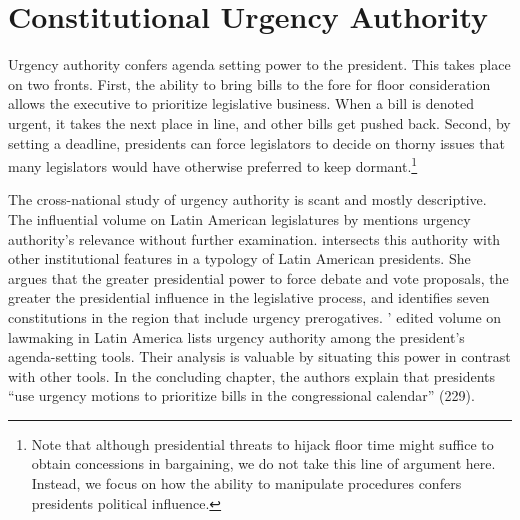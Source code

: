 \documentclass[letter,12pt]{article}
\begin{document}
\section{Constitutional Urgency Authority}

Urgency authority confers agenda setting power to the president. This takes place on two fronts. First, the ability to bring bills to the fore for floor consideration allows the executive to prioritize legislative business. When a bill is denoted urgent, it takes the next place in line, and other bills get pushed back. Second, by setting a deadline, presidents can force legislators to decide on thorny issues that many legislators would have otherwise preferred to keep dormant.\footnote{Note that although presidential threats to hijack floor time might suffice to obtain concessions in bargaining, we do not take this line of argument here. Instead, we focus on how the ability to manipulate procedures confers presidents political influence.} 

The cross-national study of urgency authority is scant and mostly descriptive. The influential volume on Latin American legislatures by \citet{morgenstern.nacif.2002} mentions urgency authority's relevance without further examination. \citet{garcia.montero.presidentes.2009} intersects this authority with other institutional features in a typology of Latin American presidents. She argues that the greater presidential power to force debate and vote proposals, the greater the presidential influence in the legislative process, and identifies seven constitutions in the region that include urgency prerogatives. \citeauthor{aleman-tsebelis-2016-book}' \citeyearpar{aleman-tsebelis-2016-book} edited volume on lawmaking in Latin America lists urgency authority among the president's agenda-setting tools. Their analysis is valuable by situating this power in contrast with other tools. In the concluding chapter, the authors explain that presidents ``use urgency motions to prioritize bills in the congressional calendar'' (229). 
\end{document}
